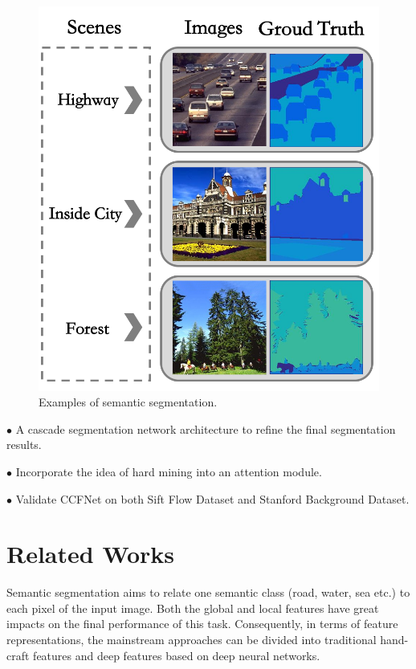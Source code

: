 \documentclass[10.5pt,compsoc]{TsT}
\newcommand{\upcite}[1]{\superscript{\textsuperscript{\cite{#1}}}}
\theoremstyle{mystyle}
\newcommand{\upcite}[1]{\textsuperscript{\cite{#1}}}
\begin{document}
{\begin{figure}
\centering
\includegraphics[width=0.95\columnwidth]{fig1.png}
\caption{Examples of semantic segmentation.}
\label{fig:example}
\end{figure} 


\noindent
  $\bullet$ A cascade segmentation network architecture to refine the final segmentation results.
  
\noindent
  $\bullet$ Incorporate the idea of hard mining into an attention module.
  
\noindent
  $\bullet$ Validate CCFNet on both Sift Flow Dataset\upcite{8} and Stanford Background Dataset\upcite{9}.


\section{Related Works}
\label{s:Related}
\noindent
Semantic segmentation aims to relate one semantic class (road, water, sea etc.) to each pixel of the input image. Both the global and local features have great impacts on the final performance of this task. Consequently, in terms of feature representations, the mainstream approaches can be divided into traditional hand-craft features and deep features based on deep neural networks. 

}
\end{document}
